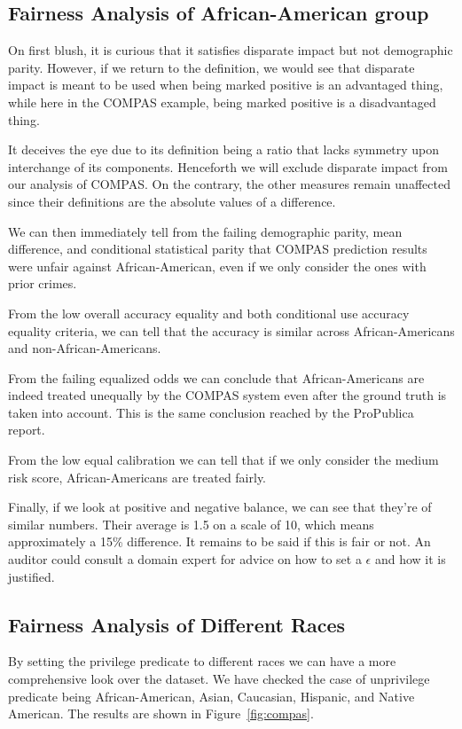 \documentclass[conference]{IEEEtran}
\begin{document}
\subsection{Fairness Analysis of African-American group}
On first blush, it is curious that it satisfies disparate impact but not demographic parity. However, if we return to the definition, we would see that disparate impact is meant to be used when being marked positive is an advantaged thing, while here in the COMPAS example, being marked positive is a disadvantaged thing.

It deceives the eye due to its definition being a ratio that lacks symmetry upon interchange of its components. Henceforth we will exclude disparate impact from our analysis of COMPAS. On the contrary, the other measures remain unaffected since their definitions are the absolute values of a difference.

We can then immediately tell from the failing demographic parity, mean difference, and conditional statistical parity that COMPAS prediction results were unfair against African-American, even if we only consider the ones with prior crimes.

From the low overall accuracy equality and both conditional use accuracy equality criteria, we can tell that the accuracy is similar across African-Americans and non-African-Americans.

From the failing equalized odds we can conclude that African-Americans are indeed treated unequally by the COMPAS system even after the ground truth is taken into account. This is the same conclusion reached by the ProPublica report.

From the low equal calibration we can tell that if we only consider the medium risk score, African-Americans are treated fairly.

Finally, if we look at positive and negative balance, we can see that they're of similar numbers. Their average is 1.5 on a scale of 10, which means approximately a 15\% difference. It remains to be said if this is fair or not. An auditor could consult a domain expert for advice on how to set a $\epsilon$ and how it is justified.

\subsection{Fairness Analysis of Different Races}
By setting the privilege predicate to different races we can have a more comprehensive look over the dataset. We have checked the case of unprivilege predicate being African-American, Asian, Caucasian, Hispanic, and Native American. The results are shown in Figure~\ref{fig:compas}.
\end{document}
